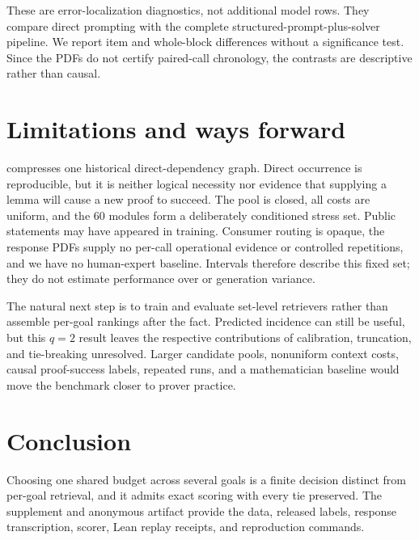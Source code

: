 \InterventionResultParagraph

These are error-localization diagnostics, not additional model rows.  They
compare direct prompting with the complete structured-prompt-plus-solver
pipeline.  We report item and whole-block differences without a significance
test.  Since the PDFs do not certify paired-call chronology, the contrasts are
descriptive rather than causal.

\section{Limitations and ways forward}

\method{} compresses one historical direct-dependency graph.  Direct occurrence
is reproducible, but it is neither logical necessity nor evidence that supplying
a lemma will cause a new proof to succeed.  The pool is closed, all costs are
uniform, and the 60 modules form a deliberately conditioned stress set.  Public
statements may have appeared in training.  Consumer routing is opaque, the
response PDFs supply no per-call operational evidence or controlled repetitions,
and we have no human-expert baseline.  Intervals therefore describe this fixed set;
they do not estimate performance over \mathlib{} or generation variance.

The natural next step is to train and evaluate set-level retrievers rather than
assemble per-goal rankings after the fact.  Predicted incidence can still be
useful, but this $q=2$ result leaves the respective contributions of calibration,
truncation, and tie-breaking unresolved.  Larger candidate pools, nonuniform context costs,
causal proof-success labels, repeated runs, and a mathematician baseline would
move the benchmark closer to prover practice.

\section{Conclusion}

Choosing one shared budget across several goals is a finite decision distinct
from per-goal retrieval, and it admits exact scoring with every tie preserved.
\ConclusionResultSentence{} The supplement and anonymous artifact provide the
data, released labels, response transcription, scorer, Lean replay receipts,
and reproduction commands.

\clearpage



\ifdefined\IncludeTechnicalSupplement
  \clearpage
  \appendix
  
\fi
